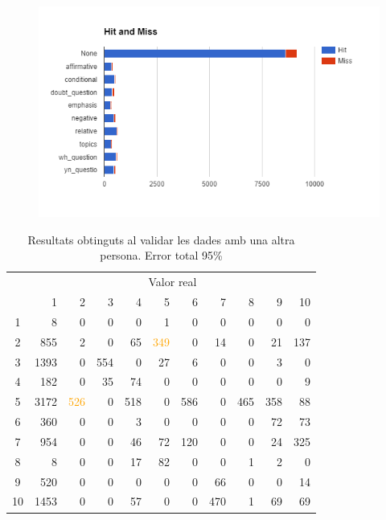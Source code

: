 \documentclass[a4paper]{article}
\begin{document}
\begin{figure}[H]
	\centering
	\includegraphics[width=\textwidth]{images/image00}
\end{figure}

\begin{table}[H]
	\centering
	\begin{tabular}{c|rrrrrrrrrr}
		& \multicolumn{10}{c}{Valor real} \\
		& 1 & 2 & 3 & 4 & 5 & 6 & 7 & 8 & 9 & 10 \\
		\hline
		1 & 8 & 0 & 0 & 0 & 1 & 0 & 0 & 0 & 0 & 0\\
		2 & 855 & 2 & 0 & 65 & \textcolor{Orange}{349} & 0 & 14 & 0 & 21 & 137\\
		3 & 1393 & 0 & 554 & 0 & 27 & 6 & 0 & 0 & 3 & 0\\
		4 & 182 & 0 & 35 & 74 & 0 & 0 & 0 & 0 & 0 & 9\\
		5 & 3172 & \textcolor{Orange}{526} & 0 & 518 & 0 & 586 & 0 & 465 & 358 & 88\\
		6 & 360 & 0 & 0 & 3 & 0 & 0 & 0 & 0 & 72 & 73\\
		7 & 954 & 0 & 0 & 46 & 72 & 120 & 0 & 0 & 24 & 325\\
		8 & 8 & 0 & 0 & 17 & 82 & 0 & 0 & 1 & 2 & 0\\
		9 & 520 & 0 & 0 & 0 & 0 & 0 & 66 & 0 & 0 & 14\\
		10 & 1453 & 0 & 0 & 57 & 0 & 0 & 470 & 1 & 69 & 69\\
	\end{tabular}
	\caption{Resultats obtinguts al validar les dades amb una altra persona. Error total 95\%}
\end{table}
\end{document}
